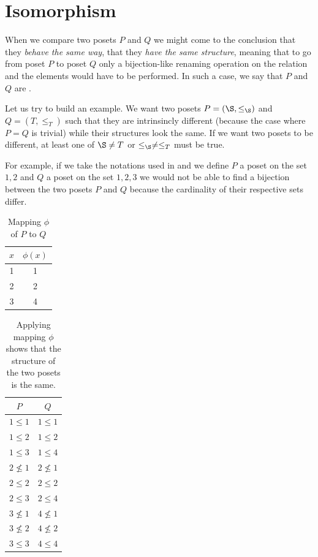\section{Isomorphism}

When we compare two posets $P$ and $Q$ we might come to the conclusion that
they \emph{behave the same way}, that they \emph{have the same structure},
meaning that to go from poset $P$ to poset $Q$ only a bijection-like renaming
operation on the relation and the elements would have to be performed. In such
a case, we say that $P$ and $Q$ are .

Let us try to build an example. We want two posets $P = (\S, \le_{\S})$ and $Q =
(T, \le_T)$ such that they are intrinsincly different (because the case where
$P = Q$ is trivial) while their structures look the same. If we want two posets
to be different, at least one of $\S \neq T$ or $\le_{\S} \neq \le_T$ must be true.

For example, if we take the notations used in  and we
define $P$ a poset on the set ${1, 2}$ and $Q$ a poset on the set ${1, 2, 3}$
we would not be able to find a bijection between the two posets $P$ and $Q$
because the cardinality of their respective sets differ.

\begin{table}
\centering
\caption{Mapping $\phi$ of $P$ to $Q$}
\label{table:poset:iso:a}
\begin{tabular}{c|c}
	$x$ & $\phi(x)$ \\
	\hline
	1 & 1 \\
	2 & 2 \\
	3 & 4 \\
\end{tabular}
\end{table}

\begin{table}
\centering
\caption{Applying mapping $\phi$ shows that the structure of the two posets is
the same.}
\label{table:poset:iso:b}
\begin{tabular}{c|c}
	$P$ & $Q$\\
	\hline
	$1 \le 1$   & $1 \le 1$\\
	$1 \le 2$   & $1 \le 2$\\
	$1 \le 3$   & $1 \le 4$\\
	$2 \nleq 1$ & $2 \nleq 1$\\
	$2 \le 2$   & $2 \le 2$\\
	$2 \le 3$   & $2 \le 4$\\
	$3 \nleq 1$ & $4 \nleq 1$\\
	$3 \nleq 2$ & $4 \nleq 2$\\
	$3 \le 3$   & $4 \le 4$\\
\end{tabular}
\end{table}

